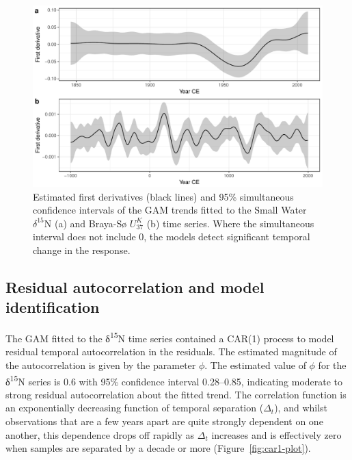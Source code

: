 \documentclass[12pt,]{article}
\newcommand{\uk}{\ensuremath{\mathit{U}^{\mathit{K}}_{\mathup{37}}}}
\begin{document}
\begin{figure}

{\centering \includegraphics[width=0.8\linewidth]{manuscript_files/figure-latex/derivatives-1} 

}

\caption{Estimated first derivatives (black lines) and 95\% simultaneous confidence intervals of the GAM trends fitted to the Small Water $\delta^{15}\text{N}$ (a) and Braya-Sø \uk{} (b) time series. Where the simultaneous interval does not include 0, the models detect significant temporal change in the response.}\label{fig:derivatives}
\end{figure}

\hypertarget{identifiability}{\subsection{Residual autocorrelation and
model identification}\label{identifiability}}

The GAM fitted to the δ\textsuperscript{15}N time series contained a
CAR(1) process to model residual temporal autocorrelation in the
residuals. The estimated magnitude of the autocorrelation is given by
the parameter \(\phi\). The estimated value of \(\phi\) for the
δ\textsuperscript{15}N series is 0.6 with 95\% confidence interval
0.28--0.85, indicating moderate to strong residual autocorrelation about
the fitted trend. The correlation function is an exponentially
decreasing function of temporal separation (\(\Delta_t\)), and whilst
observations that are a few years apart are quite strongly dependent on
one another, this dependence drops off rapidly as \(\Delta_t\) increases
and is effectively zero when samples are separated by a decade or more
(Figure~\ref{fig:car1-plot}).
\end{document}
